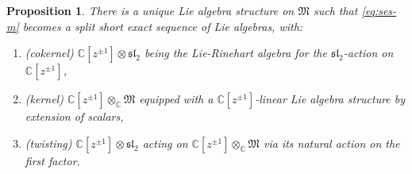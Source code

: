 \documentclass{article}
\def\fsl{\mathfrak{sl}}
\def\fM{\mathfrak{M}}
\def\CC{\mathbb{C}}
\newtheorem{prop}{Proposition}
\theoremstyle{definition}
\begin{document}
\begin{prop}\label{pro:m}
        There is a unique Lie algebra structure on $\fM$ such that
        \eqref{eq:ses-m} becomes a split short exact sequence of Lie algebras, with:
        \begin{enumerate}
                \item (cokernel) $\CC[z^{\pm1}]\otimes\fsl_2$ being the Lie-Rinehart algebra for the $\fsl_2$-action on 
                        $\CC[z^{\pm1}]$,
                \item (kernel) $\CC[z^{\pm1}]\otimes_\CC\fM$ equipped with a $\CC[z^{\pm1}]$-linear
                       Lie algebra structure by extension of scalars,
                \item  (twisting) $\CC[z^{\pm1}]\otimes\fsl_2$ acting on $\CC[z^{\pm1}]\otimes_\CC\fM$
                       via its natural action on the first factor.
        \end{enumerate}
\end{prop}
\end{document}
